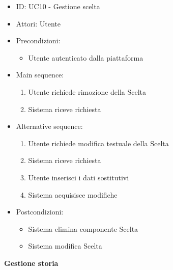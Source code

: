 \documentclass{article}
\begin{document}
\begin{itemize}[label = { }]
    \itemsep0px
    \item ID: UC10 - Gestione scelta
    \item Attori: Utente
    \item Precondizioni: 
        \begin{itemize}[label = {-}]
            \item Utente autenticato dalla piattaforma
        \end{itemize}
    \item Main sequence: 
        \begin{enumerate}
            \item Utente richiede rimozione della Scelta
            \item Sistema riceve richiesta
        \end{enumerate}
    \item Alternative sequence:
        \begin{enumerate}
            \item Utente richiede modifica testuale della Scelta
            \item Sistema riceve richiesta
            \item Utente inserisci i dati sostitutivi
            \item Sistema acquisisce modifiche
        \end{enumerate}
    \item Postcondizioni: 
        \begin{itemize}[label = {-}]
            \item Sistema elimina componente Scelta
            \item Sistema modifica Scelta
        \end{itemize}
\end{itemize}
\textbf{Gestione storia}
\end{document}
